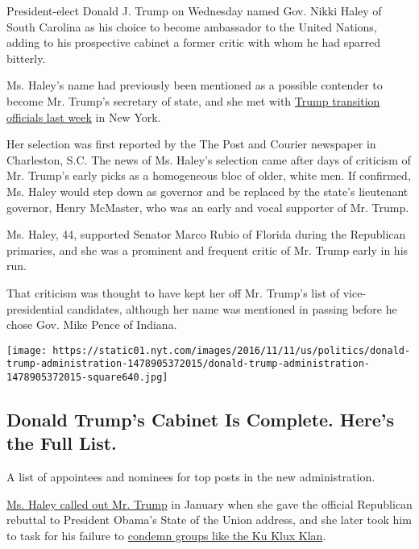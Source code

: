 President-elect Donald J. Trump on Wednesday named Gov. Nikki Haley of
South Carolina as his choice to become ambassador to the United Nations,
adding to his prospective cabinet a former critic with whom he had
sparred bitterly.

Ms. Haley's name had previously been mentioned as a possible contender
to become Mr. Trump's secretary of state, and she met with
\href{http://www.nytimes.com/2016/11/17/us/politics/donald-trump-transition.html}{Trump
transition officials last week} in New York.

Her selection was first reported by the The Post and Courier newspaper
in Charleston, S.C. The news of Ms. Haley's selection came after days of
criticism of Mr. Trump's early picks as a homogeneous bloc of older,
white men. If confirmed, Ms. Haley would step down as governor and be
replaced by the state's lieutenant governor, Henry McMaster, who was an
early and vocal supporter of Mr. Trump.

Ms. Haley, 44, supported Senator Marco Rubio of Florida during the
Republican primaries, and she was a prominent and frequent critic of Mr.
Trump early in his run.

That criticism was thought to have kept her off Mr. Trump's list of
vice-presidential candidates, although her name was mentioned in passing
before he chose Gov. Mike Pence of Indiana.

\href{https://www.nytimes.com/interactive/2016/us/politics/donald-trump-administration.html}{}

\texttt{[image: https://static01.nyt.com/images/2016/11/11/us/politics/donald-trump-administration-1478905372015/donald-trump-administration-1478905372015-square640.jpg]}

\hypertarget{donald-trumps-cabinet-is-complete-heres-the-full-list}{%
\subsection{Donald Trump's Cabinet Is Complete. Here's the Full
List.}\label{donald-trumps-cabinet-is-complete-heres-the-full-list}}

A list of appointees and nominees for top posts in the new
administration.

\href{http://www.nytimes.com/politics/first-draft/2016/01/13/nikki-haley-turns-on-donald-trump-in-rebuttal-address/}{Ms.
Haley called out Mr. Trump} in January when she gave the official
Republican rebuttal to President Obama's State of the Union address, and
she later took him to task for his failure to
\href{http://www.nytimes.com/politics/first-draft/2016/02/29/nikki-haley-faults-donald-trump-for-not-condemning-white-supremacists/}{condemn
groups like the Ku Klux Klan}.

